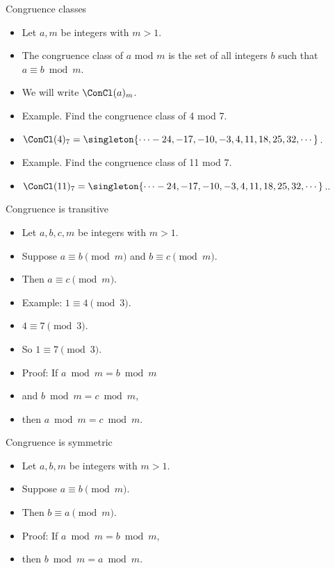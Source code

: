\documentclass{beamer}
\begin{document}
\begin{frame}{Congruence classes}

\begin{itemize}
  \item  Let $a,m$ be integers with $m>1$.
  \item The congruence class of $a$ mod $m$ is the set of all integers $b$ such that $a\equiv b \bmod m$.
  \item We will write $\ConCl(a)_m$.
  \item Example. Find the congruence class of 4 mod 7.
  \item $\ConCl(4)_7 = \singleton{\cdots -24, -17, -10, -3, 4, 11, 18, 25, 32, \cdots}$.
  \item Example. Find the congruence class of 11 mod 7.
  \item $\ConCl(11)_7 = \singleton{\cdots -24, -17, -10, -3, 4, 11, 18, 25, 32, \cdots}$..
\end{itemize}

\end{frame}

\begin{frame}{Congruence is transitive}

\begin{itemize}
  \item  Let $a,b,c,m$ be integers with $m>1$.
  \item Suppose $a\equiv b \pmod m$ and $b \equiv c \pmod m$.
  \item Then $a\equiv c \pmod m$.
  \item Example: $1 \equiv 4 \pmod 3$.
  \item $4 \equiv 7 \pmod 3$.
  \item So $1 \equiv 7 \pmod 3$.
  \item Proof: If $a \bmod m = b \bmod m$
  \item and $b \bmod m = c \bmod m$,
  \item then $a\bmod m = c \bmod m$.
\end{itemize}

\end{frame}

\begin{frame}{Congruence is symmetric}

\begin{itemize}
  \item  Let $a,b,m$ be integers with $m>1$.
  \item Suppose $a\equiv b \pmod m$.
  \item Then $b\equiv a \pmod m$.
  \item Proof: If $a \bmod m = b \bmod m$,
  \item then $b\bmod m = a \bmod m$.
\end{itemize}

\end{frame}
\end{document}
